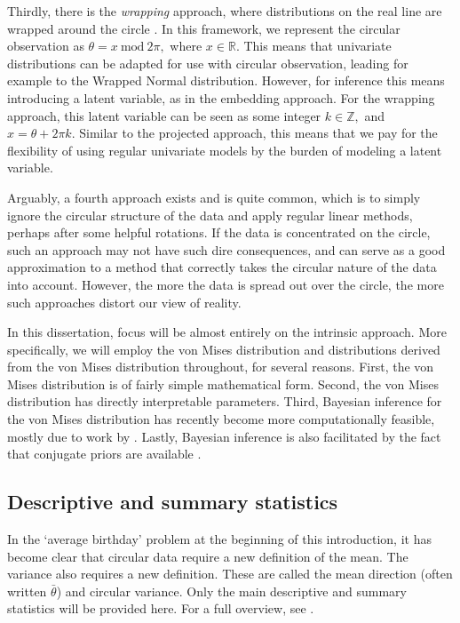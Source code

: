 \documentclass[12pt, a4paper]{book}\usepackage[]{graphicx}\usepackage[]{color}
\begin{document}
Thirdly, there is the \textit{wrapping} approach, where distributions on the real line are wrapped around the circle \citep{ferrari2009wrapping}. In this framework,  we represent the circular observation as $\theta = x ~\text{mod} ~ 2\pi,$ where \(x \in \mathbb{R}\). This means that univariate distributions can be adapted for use with circular observation, leading for example to the Wrapped Normal distribution. However, for inference this means introducing a latent variable, as in the embedding approach. For the wrapping approach, this latent variable can be seen as some integer $k \in \mathbb{Z},$ and $x = \theta + 2\pi k.$ Similar to the projected approach, this means that we pay for the flexibility of using regular univariate models by the burden of modeling a latent variable.

Arguably, a fourth approach exists and is quite common, which is to simply ignore the circular structure of the data and apply regular linear methods, perhaps after some helpful rotations. If the data is concentrated on the circle, such an approach may not have such dire consequences, and can serve as a good approximation to a method that correctly takes the circular nature of the data into account. However, the more the data is spread out over the circle, the more such approaches distort our view of reality.

In this dissertation, focus will be almost entirely on the intrinsic approach. More specifically, we will employ the von Mises distribution and distributions derived from the von Mises distribution throughout, for several reasons. First, the von Mises distribution is of fairly simple mathematical form. Second, the von Mises distribution has directly interpretable parameters. Third, Bayesian inference for the von Mises distribution has recently become more computationally feasible, mostly due to work by \citet{forbes2015fast}. Lastly, Bayesian inference is also facilitated by the fact that conjugate priors are available \citep{mardia1976bayesian}.


\subsection*{Descriptive and summary statistics}


In the `average birthday' problem at the beginning of this introduction, it has become clear that circular data require a new definition of the mean. The variance also requires a new definition. These are called the mean direction (often written $\bar{\theta}$) and circular variance. Only the main descriptive and summary statistics will be provided here. For a full overview, see  \citet{mardia2009directional}.
\end{document}
